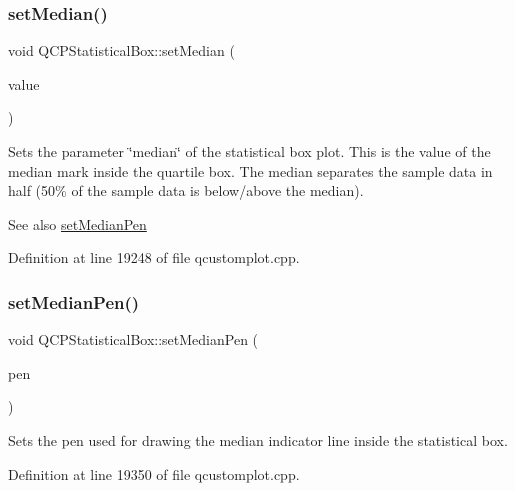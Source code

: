 \mbox{\label{class_q_c_p_statistical_box_a65970e77a897da4ecb4b15300868aad3}} 
\subsubsection{\texorpdfstring{set\+Median()}{setMedian()}}
{\footnotesize\ttfamily void Q\+C\+P\+Statistical\+Box\+::set\+Median (\begin{DoxyParamCaption}\item[{double}]{value }\end{DoxyParamCaption})}

Sets the parameter \char`\"{}median\char`\"{} of the statistical box plot. This is the value of the median mark inside the quartile box. The median separates the sample data in half (50\% of the sample data is below/above the median).

\begin{DoxySeeAlso}{See also}
\hyperlink{class_q_c_p_statistical_box_a7260ac55b669f5d0a74f16d5ca84c52c}{set\+Median\+Pen} 
\end{DoxySeeAlso}


Definition at line 19248 of file qcustomplot.\+cpp.

\mbox{\label{class_q_c_p_statistical_box_a7260ac55b669f5d0a74f16d5ca84c52c}} 
\subsubsection{\texorpdfstring{set\+Median\+Pen()}{setMedianPen()}}
{\footnotesize\ttfamily void Q\+C\+P\+Statistical\+Box\+::set\+Median\+Pen (\begin{DoxyParamCaption}\item[{const Q\+Pen \&}]{pen }\end{DoxyParamCaption})}

Sets the pen used for drawing the median indicator line inside the statistical box. 

Definition at line 19350 of file qcustomplot.\+cpp.

\mbox{\label{class_q_c_p_statistical_box_a84ff7cc61ba44890f0c3e0c99c19941e}} 
